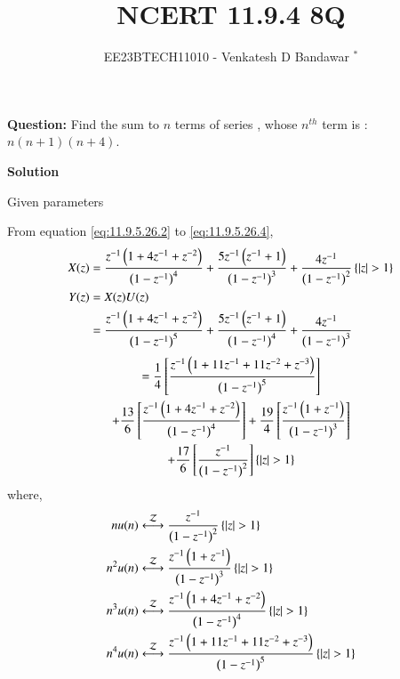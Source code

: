 \documentclass[journal,12pt,twocolumn]{IEEEtran}
\theoremstyle{remark}
\begin{document}

\vspace{3cm}

\title{NCERT 11.9.4 8Q}
\author{EE23BTECH11010 - Venkatesh D Bandawar $^{*}$%
}
\maketitle
\bigskip

\renewcommand{\thefigure}{\theenumi}
\renewcommand{\thetable}{\theenumi}

\textbf{Question:} Find the sum to $n$ terms of series , whose $n^{th}$ term is : $n(n+1)(n+4)$.

\textbf{Solution}
\begin{table}[!h] 
\centering

\caption{Given parameters}
\label{given parameters list}
\end{table}

From equation \eqref{eq:11.9.5.26.2} to \eqref{eq:11.9.5.26.4},\\
    \begin{align}
        X(z) &= \frac{z^{-1}\left(1+4z^{-1}+z^{-2}\right)}{\left(1-z^{-1}\right)^4} + \frac{5z^{-1}\left(z^{-1}+1\right)}{\left(1-z^{-1}\right)^3} + \frac{4z^{-1}}{\left(1-z^{-1}\right)^2} \left\{\left\vert z\right\vert>1\right\}\\
         Y(z) &= X(z)U(z)\\
         &=\frac{z^{-1}\left(1+4z^{-1}+z^{-2}\right)}{\left(1-z^{-1}\right)^5} + \frac{5z^{-1}\left(z^{-1}+1\right)}{\left(1-z^{-1}\right)^4} + \frac{4z^{-1}}{\left(1-z^{-1}\right)^3} 
    \end{align}
    \begin{multline}
        = \frac{1}{4}{}\left[\frac{z^{-1}\left(1+11z^{-1}+11z^{-2}+z^{-3}\right)}{\left(1-z^{-1}\right)^5}\right] \\
        +\frac{13}{6}{}\left[\frac{z^{-1}\left(1+4z^{-1}+z^{-2}\right)}{\left(1-z^{-1}\right)^4}\right] + \frac{19}{4}{}\left[\frac{z^{-1}\left(1+z^{-1}\right)}{\left(1-z^{-1}\right)^3}\right]\\
        + \frac{17}{6}{}\left[\frac{z^{-1}}{\left(1-z^{-1}\right)^2}\right] \left\{\left\vert z\right\vert>1\right\}
    \end{multline}
    where,
    \begin{align}
        n u(n) &\system{Z} \frac{z^{-1}}{\brak{1-z^{-1}}^2} \cbrak{\abs{z}>1} \label{eq:z transform of nu(n)} \\
        n^2 u(n) &\system{Z} \frac{z^{-1}\brak{1+z^{-1}}}{\brak{1-z^{-1}}^3} \cbrak{\abs{z}>1}\label{eq:z transform of n^2u(n)} \\
        n^3 u(n) &\system{Z} \frac{z^{-1}\brak{1+4z^{-1}+z^{-2}}}{\brak{1-z^{-1}}^4} \cbrak{\abs{z}>1}\label{eq:z transform of n^3u(n)} \\
        n^4 u(n) &\system{Z} \frac{z^{-1}\brak{1+11z^{-1}+11z^{-2}+z^{-3}}}{\brak{1-z^{-1}}^5} \cbrak{\abs{z}>1}\label{eq:z transform of n^4u(n)}
    \end{align}
    
\end{document}
